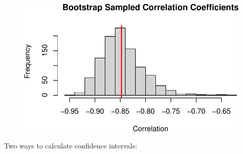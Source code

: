 \documentclass[
  letterpaper,
  DIV=11,
  numbers=noendperiod]{scrreport}
\begin{document}
\begin{figure}[H]

{\centering \includegraphics{week6/week6_files/figure-pdf/unnamed-chunk-5-1.pdf}

}

\end{figure}

Two ways to calculate confidence intervals:
\end{document}
